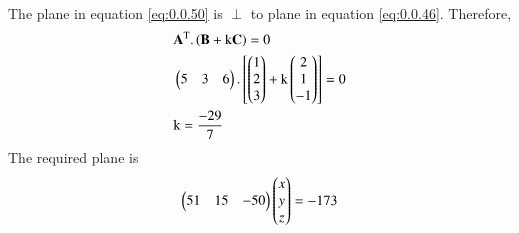 \documentclass[journal,12pt,twocolumn]{IEEEtran}
\begin{document}
\begin{enumerate}
\begin{align}
\end{align}
The plane in equation \eqref{eq:0.0.50} is $\perp$ to plane in equation \eqref{eq:0.0.46}. Therefore,
\begin{align}  
&\mathbf{A}^\text T. \left(\mathbf{B}+\text k\mathbf{C}\right) =0\\
&\begin{pmatrix}5&3&6\end{pmatrix}.\left[\begin{pmatrix}1\\2\\3\end{pmatrix}+\text k\begin{pmatrix}2\\1\\-1\end{pmatrix}\right]=0\\
&\text k= \displaystyle\frac{-29}{7}
\end{align}
The required plane is \begin{align} \begin{pmatrix}51&15&-50\end{pmatrix}\begin{pmatrix}x\\y\\z\end{pmatrix}=-173 \end{align}
\end{enumerate}
\end{document}
